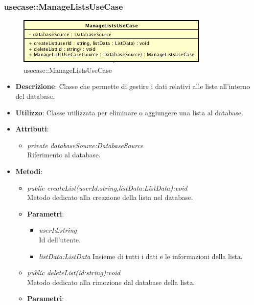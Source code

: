 \subsubsection{usecase::ManageListsUseCase}

\label{usecase::ManageListsUseCase}
\begin{figure}[ht]
	\centering
	\includegraphics[scale=0.5]{Sezioni/SottosezioniST/img/app/ManageListsUseCase.png}
	\caption{usecase::ManageListsUseCase}
\end{figure}

\begin{itemize}
\item \textbf{Descrizione}: Classe che permette di gestire i dati relativi alle liste all'interno del database.
\item \textbf{Utilizzo}: Classe utilizzata per eliminare o aggiungere una lista al database.
\item \textbf{Attributi}: 
	\begin{itemize}
	\item \textit{private databaseSource:DatabaseSource}\\
		Riferimento al database.
	\end{itemize}
\item \textbf{Metodi}:
	\begin{itemize}
	\item \textit{public createList(userId:string,listData:ListData):void}\\
		Metodo dedicato alla creazione della lista nel database.
			\item{\textbf{Parametri}: \begin{itemize}
			\item \textit{userId:string}\\
			Id dell'utente.
			\item \textit{listData:ListData}
			Insieme di tutti i dati e le informazioni della lista.
			\end{itemize}}
	\item \textit{public deleteList(id:string):void}\\
	Metodo dedicato alla rimozione dal database della lista.
			\item{\textbf{Parametri}: \begin{itemize}

\end{itemize}}
\end{itemize}
\end{itemize}
